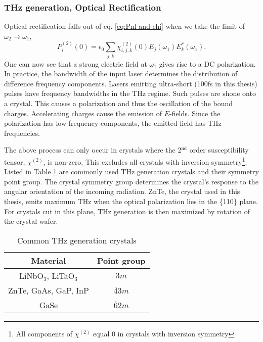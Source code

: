 \subsubsection{THz generation, Optical Rectification}\label{sec:THz_gen}


Optical rectification falls out of eq. \eqref{eq:Pnl and chi} when we take the limit of $\omega_2 \to \omega_1$, 
\begin{equation}
P^{(2)}_i(0)=\epsilon_0 \sum_{j,k}\chi_{i,j,k}^{(2)}(0) E_j(\omega_1)E_k^{*}(\omega_1).
\label{eq:Pnl0}
\end{equation}
One can now see that a strong electric field at $\omega_1$ gives rise to a DC polarization. In practice, the bandwidth of the input laser determines the distribution of difference frequency components. Lasers emitting ultra-short (100fs in this thesis) pulses have frequency bandwidths in the THz regime. Such pulses are shone onto a crystal. This causes a polarization and thus the oscillation of the bound charges. Accelerating charges cause the emission of $E$-fields. Since the polarization has low frequency components, the emitted field has THz frequencies. 


The above process can only occur in crystals where the 2$^{\text{nd}}$ order susceptibility tensor, $\chi^{(2)}$, is non-zero. This excludes all crystals with inversion symmetry\footnote{All components of $\chi^{(2)}$ equal $0$ in crystals with inversion symmetry}. Listed in Table \ref{tab:THz crystals} are commonly used THz generation crystals and their symmetry point group. The crystal symmetry group determines the crystal's response to the angular orientation of the incoming radiation. ZnTe, the crystal used in this thesis, emits maximum THz when the optical polarization lies in the \{110\} plane. For crystals cut in this plane, THz generation is then maximized by rotation of the crystal wafer. 
\begin{table}[h!]
\caption{Common THz generation crystals}
\centering
\begin{tabular} {c c}
\hline\hline
Material & Point group \\
\hline
LiNbO$_{3}$, LiTaO$_{3}$ & $3m$\\
ZnTe, GaAs, GaP, InP & $\bar{4}3m$ \\
GaSe & $\bar{6}2m$\\
\hline
\end{tabular}
\label{tab:THz crystals}
\end{table}

